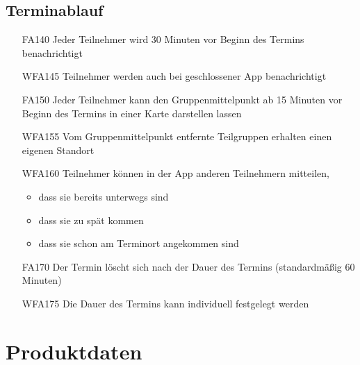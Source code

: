 \documentclass{scrartcl}
\begin{document}
	\subsection{Terminablauf}
	\begin{itemize}
	\hypertarget{FA140}{}
		\item[FA140] Jeder \gls{Teilnehmer} wird 30 Minuten vor Beginn des Termins benachrichtigt
		\hypertarget{WFA145}{}
		\item[WFA145] Teilnehmer werden auch bei geschlossener App benachrichtigt
		\hypertarget{FA150}{}
		\item[FA150] Jeder Teilnehmer kann den Gruppenmittelpunkt ab 15 Minuten vor Beginn des Termins in einer Karte darstellen lassen
		\hypertarget{WFA155}{}
		\item[WFA155] Vom Gruppenmittelpunkt entfernte Teilgruppen  erhalten einen eigenen Standort 
		\hypertarget{WFA160}{}
		\item[WFA160] Teilnehmer können in der App anderen Teilnehmern mitteilen,
		\begin{itemize}
			\item dass sie bereits unterwegs sind
			\item dass sie zu spät kommen
			\item dass sie schon am Terminort angekommen sind
		\end{itemize}
		\hypertarget{FA170}{}
		\item[FA170] Der Termin löscht sich nach der Dauer des Termins (standardmäßig 60 Minuten)
		\hypertarget{WFA175}{}
		\item[WFA175] Die Dauer des Termins kann individuell festgelegt werden
	\end{itemize}
		
	
	\newpage
	
	
	\section{Produktdaten}
	
\end{document}
